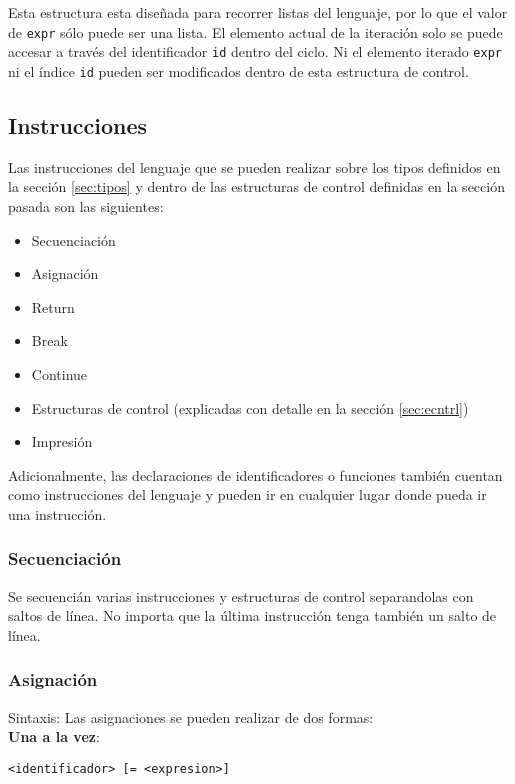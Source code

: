 \documentclass[12pt, spanish]{report}
\begin{document}
Esta estructura esta dise\~nada para recorrer listas del lenguaje, 
por lo que el valor de \texttt{expr} s\'olo puede ser una lista.
El elemento actual de la iteraci\'on solo se puede accesar a trav\'es 
del identificador \texttt{id} dentro del ciclo. Ni el elemento iterado 
\texttt{expr} ni el \'indice \texttt{id} pueden ser modificados dentro
de esta estructura de control.\\


\subsection{Instrucciones}
\label{sec:instr}

Las instrucciones del lenguaje que se pueden realizar sobre los tipos
definidos en la secci\'on \ref{sec:tipos} y dentro de las estructuras
de control definidas en la secci\'on pasada son las siguientes:

\begin{itemize}
\item Secuenciaci\'on
\item Asignaci\'on
\item Return
\item Break
\item Continue
\item Estructuras de control (explicadas con detalle en la secci\'on \ref{sec:ecntrl})
\item Impresi\'on
\end{itemize}

Adicionalmente, las declaraciones de identificadores o funciones
tambi\'en cuentan como instrucciones del lenguaje y pueden ir en
cualquier lugar donde pueda ir una instrucci\'on.

\subsubsection{Secuenciaci\'on}
Se secuenci\'an varias instrucciones y estructuras de control
separandolas con saltos de l\'inea. No importa que la \'ultima
instrucci\'on tenga tambi\'en un salto de l\'inea.

\subsubsection{Asignaci\'on}
Sintaxis:
Las asignaciones se pueden realizar de dos formas:\\

\textbf{Una a la vez}:
\begin{verbatim}
<identificador> [= <expresion>]
\end{verbatim}
\end{document}
